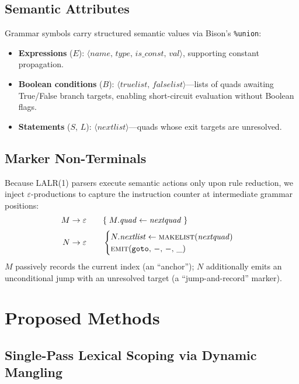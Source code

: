\documentclass[conference]{IEEEtran}
\begin{document}
\subsection{Semantic Attributes}
Grammar symbols carry structured semantic values via Bison's \texttt{\%union}:
\begin{itemize}[leftmargin=*]
\item \textbf{Expressions} ($E$): $\langle \mathit{name},\, \mathit{type},\, \mathit{is\_const},\, \mathit{val}\rangle$, supporting constant propagation.
\item \textbf{Boolean conditions} ($B$): $\langle \mathit{truelist},\, \mathit{falselist}\rangle$---lists of quads awaiting True/False branch targets, enabling short-circuit evaluation without Boolean flags.
\item \textbf{Statements} ($S$, $L$): $\langle \mathit{nextlist}\rangle$---quads whose exit targets are unresolved.
\end{itemize}

\subsection{Marker Non-Terminals}
Because LALR(1) parsers execute semantic actions only upon rule reduction, we inject $\varepsilon$-productions to capture the instruction counter at intermediate grammar positions:
\begin{align}
M &\to \varepsilon \qquad \{\; M.\mathit{quad} \leftarrow \mathit{nextquad}\;\} \label{eq:M} \\[2pt]
N &\to \varepsilon \qquad
\begin{cases}
N.\mathit{nextlist} \leftarrow \textsc{makelist}(\mathit{nextquad})\\
\textsc{emit}(\texttt{goto},\, -,\, -,\, \_)
\end{cases} \label{eq:N}
\end{align}
$M$ passively records the current index (an ``anchor''); $N$ additionally emits an unconditional jump with an unresolved target (a ``jump-and-record'' marker).

\section{Proposed Methods}

\subsection{Single-Pass Lexical Scoping via Dynamic Mangling}
\label{sec:scoping}
\end{document}
